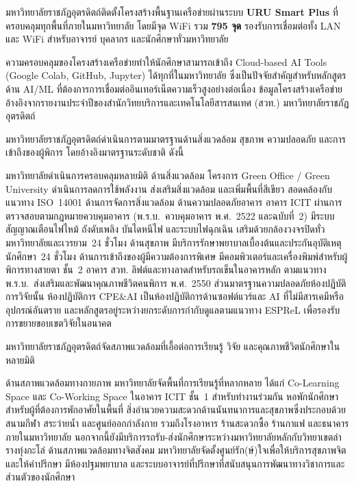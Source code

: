 มหาวิทยาลัยราชภัฏอุตรดิตถ์ติดตั้งโครงสร้างพื้นฐานเครือข่ายผ่านระบบ \textbf{URU Smart Plus} ที่ครอบคลุมทุกพื้นที่ภายในมหาวิทยาลัย โดยมีจุด WiFi รวม \textbf{795 จุด} รองรับการเชื่อมต่อทั้ง LAN และ WiFi สำหรับอาจารย์ บุคลากร และนักศึกษาทั่วมหาวิทยาลัย

ความครอบคลุมของโครงสร้างเครือข่ายทำให้นักศึกษาสามารถเข้าถึง Cloud-based AI Tools (Google Colab, GitHub, Jupyter) ได้ทุกที่ในมหาวิทยาลัย ซึ่งเป็นปัจจัยสำคัญสำหรับหลักสูตรด้าน AI/ML ที่ต้องการการเชื่อมต่ออินเทอร์เน็ตความเร็วสูงอย่างต่อเนื่อง ข้อมูลโครงสร้างเครือข่ายอ้างอิงจากรายงานประจำปีของสำนักวิทยบริการและเทคโนโลยีสารสนเทศ (สวท.) มหาวิทยาลัยราชภัฏอุตรดิตถ์


มหาวิทยาลัยราชภัฏอุตรดิตถ์ดำเนินการตามมาตรฐานด้านสิ่งแวดล้อม สุขภาพ ความปลอดภัย และการเข้าถึงของผู้พิการ โดยอ้างอิงมาตรฐานระดับชาติ ดังนี้

มหาวิทยาลัยดำเนินการครอบคลุมหลายมิติ ด้านสิ่งแวดล้อม โครงการ Green Office / Green University ดำเนินการลดการใช้พลังงาน ส่งเสริมสิ่งแวดล้อม และเพิ่มพื้นที่สีเขียว สอดคล้องกับแนวทาง ISO~14001 ด้านการจัดการสิ่งแวดล้อม ด้านความปลอดภัยอาคาร อาคาร ICIT ผ่านการตรวจสอบตามกฎหมายควบคุมอาคาร (พ.ร.บ.\ ควบคุมอาคาร พ.ศ.~2522 และฉบับที่~2) มีระบบสัญญาณเตือนไฟไหม้ ถังดับเพลิง บันไดหนีไฟ และระบบไฟฉุกเฉิน เสริมด้วยกล้องวงจรปิดทั่วมหาวิทยาลัยและเวรยาม~24 ชั่วโมง ด้านสุขภาพ มีบริการรักษาพยาบาลเบื้องต้นและประกันอุบัติเหตุนักศึกษา~24 ชั่วโมง ด้านการเข้าถึงของผู้มีความต้องการพิเศษ มีคอมพิวเตอร์และเครื่องพิมพ์สำหรับผู้พิการทางสายตา ชั้น~2 อาคาร สวท. ลิฟต์และทางลาดสำหรับรถเข็นในอาคารหลัก ตามแนวทาง พ.ร.บ.\ ส่งเสริมและพัฒนาคุณภาพชีวิตคนพิการ พ.ศ.~2550 ส่วนมาตรฐานความปลอดภัยห้องปฏิบัติการวิจัยนั้น ห้องปฏิบัติการ CPE\&AI เป็นห้องปฏิบัติการด้านซอฟต์แวร์และ AI ที่ไม่มีสารเคมีหรืออุปกรณ์อันตราย และหลักสูตรอยู่ระหว่างยกระดับการกำกับดูแลตามแนวทาง ESPReL เพื่อรองรับการขยายขอบเขตวิจัยในอนาคต


มหาวิทยาลัยราชภัฏอุตรดิตถ์จัดสภาพแวดล้อมที่เอื้อต่อการเรียนรู้ วิจัย และคุณภาพชีวิตนักศึกษาในหลายมิติ

ด้านสภาพแวดล้อมทางกายภาพ มหาวิทยาลัยจัดพื้นที่การเรียนรู้ที่หลากหลาย ได้แก่ Co-Learning Space และ Co-Working Space ในอาคาร ICIT ชั้น~1 สำหรับทำงานร่วมกัน หอพักนักศึกษาสำหรับผู้ที่ต้องการพักอาศัยในพื้นที่ สิ่งอำนวยความสะดวกด้านนันทนาการและสุขภาพซึ่งประกอบด้วยสนามกีฬา สระว่ายน้ำ และศูนย์ออกกำลังกาย รวมถึงโรงอาหาร ร้านสะดวกซื้อ ร้านกาแฟ และธนาคารภายในมหาวิทยาลัย นอกจากนี้ยังมีบริการรถรับ-ส่งนักศึกษาระหว่างมหาวิทยาลัยหลักกับวิทยาเขตลำรางทุ่งกะโล่ ด้านสภาพแวดล้อมทางจิตสังคม มหาวิทยาลัยจัดตั้งศูนย์รัก(ษ์)ใจเพื่อให้บริการสุขภาพจิตและให้คำปรึกษา มีห้องปฐมพยาบาล และระบบอาจารย์ที่ปรึกษาที่สนับสนุนการพัฒนาทางวิชาการและส่วนตัวของนักศึกษา

